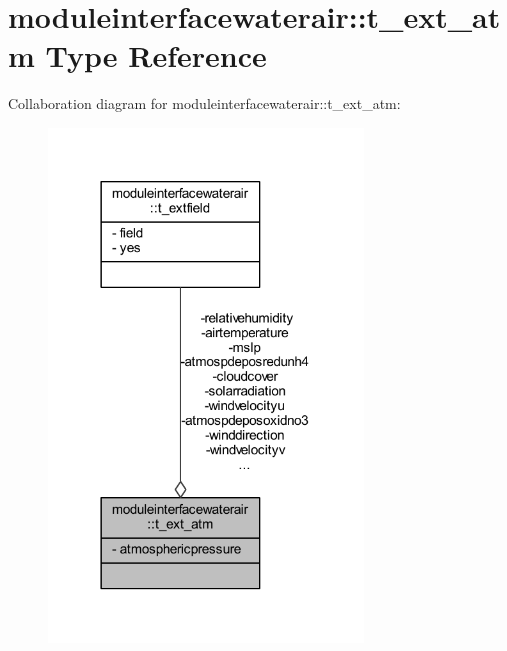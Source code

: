 \hypertarget{structmoduleinterfacewaterair_1_1t__ext__atm}{}\section{moduleinterfacewaterair\+:\+:t\+\_\+ext\+\_\+atm Type Reference}
\label{structmoduleinterfacewaterair_1_1t__ext__atm}


Collaboration diagram for moduleinterfacewaterair\+:\+:t\+\_\+ext\+\_\+atm\+:\nopagebreak
\begin{figure}[H]
\begin{center}
\leavevmode
\includegraphics[width=237pt]{structmoduleinterfacewaterair_1_1t__ext__atm__coll__graph}
\end{center}
\end{figure}
